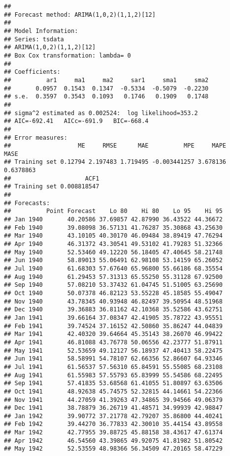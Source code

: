 \documentclass[
]{article}
\begin{document}
\begin{verbatim}
## 
## Forecast method: ARIMA(1,0,2)(1,1,2)[12]
## 
## Model Information:
## Series: tsdata 
## ARIMA(1,0,2)(1,1,2)[12] 
## Box Cox transformation: lambda= 0 
## 
## Coefficients:
##          ar1     ma1     ma2     sar1     sma1     sma2
##       0.0957  0.1543  0.1347  -0.5334  -0.5079  -0.2230
## s.e.  0.3597  0.3543  0.1093   0.1746   0.1909   0.1748
## 
## sigma^2 estimated as 0.002524:  log likelihood=353.2
## AIC=-692.41   AICc=-691.9   BIC=-668.4
## 
## Error measures:
##                   ME     RMSE      MAE          MPE     MAPE      MASE
## Training set 0.12794 2.197483 1.719495 -0.003441257 3.678136 0.6378863
##                     ACF1
## Training set 0.008818547
## 
## Forecasts:
##          Point Forecast    Lo 80    Hi 80    Lo 95    Hi 95
## Jan 1940       40.20586 37.69857 42.87990 36.43522 44.36672
## Feb 1940       39.08098 36.57131 41.76287 35.30868 43.25630
## Mar 1940       43.10105 40.30170 46.09484 38.89419 47.76294
## Apr 1940       46.31372 43.30541 49.53102 41.79283 51.32366
## May 1940       52.53460 49.12220 56.18405 47.40645 58.21748
## Jun 1940       58.89013 55.06491 62.98108 53.14159 65.26052
## Jul 1940       61.68303 57.67640 65.96800 55.66186 68.35554
## Aug 1940       61.29453 57.31313 65.55250 55.31128 67.92500
## Sep 1940       57.08210 53.37432 61.04745 51.51005 63.25690
## Oct 1940       50.07378 46.82123 53.55228 45.18585 55.49047
## Nov 1940       43.78345 40.93948 46.82497 39.50954 48.51968
## Dec 1940       39.36883 36.81162 42.10368 35.52586 43.62751
## Jan 1941       39.66164 37.08347 42.41905 35.78722 43.95551
## Feb 1941       39.74524 37.16152 42.50860 35.86247 44.04839
## Mar 1941       42.40320 39.64664 45.35143 38.26070 46.99422
## Apr 1941       46.81088 43.76778 50.06556 42.23777 51.87911
## May 1941       52.53659 49.12127 56.18937 47.40413 58.22475
## Jun 1941       58.58991 54.78107 62.66356 52.86607 64.93346
## Jul 1941       61.56537 57.56310 65.84591 55.55085 68.23108
## Aug 1941       61.55983 57.55793 65.83999 55.54586 68.22495
## Sep 1941       57.41835 53.68568 61.41055 51.80897 63.63506
## Oct 1941       48.92638 45.74575 52.32815 44.14661 54.22366
## Nov 1941       44.27059 41.39263 47.34865 39.94566 49.06379
## Dec 1941       38.78879 36.26719 41.48571 34.99939 42.98847
## Jan 1942       39.90772 37.21778 42.79207 35.86800 44.40241
## Feb 1942       39.44270 36.77833 42.30010 35.44154 43.89558
## Mar 1942       42.77955 39.88725 45.88158 38.43617 47.61374
## Apr 1942       46.54560 43.39865 49.92075 41.81982 51.80542
## May 1942       52.53559 48.98366 56.34509 47.20165 58.47229

\end{verbatim}
\end{document}
